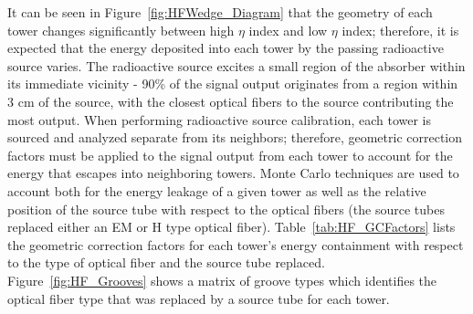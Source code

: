 It can be seen in Figure~\ref{fig:HFWedge_Diagram} that the geometry of each tower
changes significantly between high $\eta$ index and low $\eta$ index; therefore, it is expected that
the energy deposited into each tower by the passing radioactive source varies. The radioactive source
excites a small region of the absorber within its immediate vicinity - 90\% of the signal output
originates from a region within 3 cm of the source, with the closest optical fibers to the source
contributing the most output. When performing radioactive source calibration, each tower is sourced
and analyzed separate from its neighbors; therefore, geometric correction factors must be applied to
the signal output from each tower to account for the energy that escapes into neighboring towers.
Monte Carlo techniques are used to account both for the energy leakage of a given tower as well as
the relative position of the source tube with respect to the optical fibers (the source tubes replaced
either an EM or H type optical fiber). Table~\ref{tab:HF_GCFactors} lists the geometric correction
factors for each tower's energy containment with respect to the type of optical fiber and the source tube
replaced. Figure~\ref{fig:HF_Grooves} shows a matrix of groove types which identifies the  optical fiber type that was replaced by a source tube for each tower.

